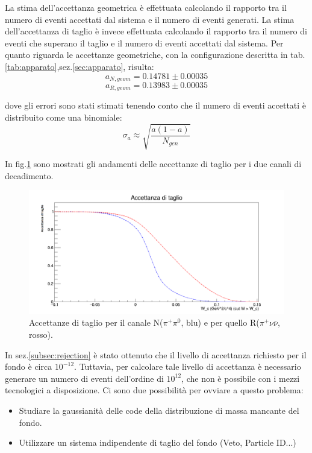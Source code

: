 \documentclass[8pt]{extarticle}
\begin{document}
La stima dell'accettanza geometrica è effettuata calcolando il rapporto tra il numero di eventi accettati dal sistema e il numero di eventi generati. La stima dell'accettanza di taglio è invece effettuata calcolando il rapporto tra il numero di eventi che superano il taglio e il numero di eventi accettati dal sistema. Per quanto riguarda le accettanze geometriche, con la configurazione descritta in tab.\ref{tab:apparato},sez.\ref{sec:apparato}, risulta:
$$
a_{N, geom} = 0.14781 \pm 0.00035
$$
$$
a_{R, geom} = 0.13983 \pm 0.00035
$$

dove gli errori sono stati stimati tenendo conto che il numero di eventi accettati è distribuito come una binomiale: 
$$
\sigma_a \approx \sqrt{\frac{a(1-a)}{N_{gen}}}
$$

 In fig.\ref{fig:acc_taglio} sono mostrati gli andamenti delle accettanze di taglio per i due canali di decadimento.
 
 \begin{figure}
 \begin{center}
 	\includegraphics[scale=0.3]{acc_taglio}
 	\caption{Accettanze di taglio per il canale N($\pi^+ \pi^0$, blu) e per quello R($\pi^+ \nu \bar{\nu}$, rosso).}
 	\label{fig:acc_taglio}
 \end{center}
 \end{figure}

In sez.\ref{subsec:rejection} è stato ottenuto che il livello di accettanza richiesto per il fondo è circa $10^{-12}$. Tuttavia, per calcolare tale livello di accettanza è necessario generare un numero di eventi dell'ordine di $10^{12}$, che non è possibile con i mezzi tecnologici a disposizione. Ci sono due possibilità per ovviare a questo problema: 

\begin{itemize}
\item Studiare la gaussianità delle code della distribuzione di massa mancante del fondo.
\item Utilizzare un sistema indipendente di taglio del fondo (Veto, Particle ID...)
\end{itemize}
\end{document}
